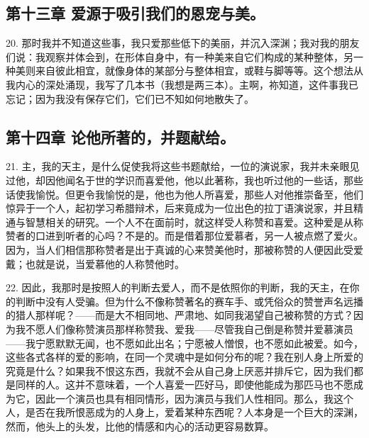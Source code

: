 
\subsection{第十三章 爱源于吸引我们的恩宠与美。}

20. 那时我并不知道这些事，我只爱那些低下的美丽，并沉入深渊；我对我的朋友们说：我观察并体会到，在形体自身中，有一种美来自它们构成的某种整体，另一种美则来自彼此相宜，就像身体的某部分与整体相宜，或鞋与脚等等。这个想法从我内心的深处涌现，我写了几本书（我想是两三本）。主啊，祢知道，这件事我已忘记；因为我没有保存它们，它们已不知如何地散失了。\par


\subsection{第十四章 论他所著的，并题献给。}

21. 主，我的天主，是什么促使我将这些书题献给，一位的演说家，我并未亲眼见过他，却因他闻名于世的学识而喜爱他，他以此著称，我也听过他的一些话，那些话使我愉悦。但更令我愉悦的是，他也为他人所喜爱，那些人对他推崇备至，他们惊异于一个人，起初学习希腊辩术，后来竟成为一位出色的拉丁语演说家，并且精通与智慧相关的研究。一个人不在面前时，就这样受人称赞和喜爱。这种爱是从称赞者的口进到听者的心吗？不是的。而是借着那位爱慕者，另一人被点燃了爱火。因为，当人们相信那称赞者是出于真诚的心来赞美他时，那被称赞的人便因此受爱戴；也就是说，当爱慕他的人称赞他时。\par

22. 因此，我那时是按照人的判断去爱人，而不是依照你的判断，我的天主，在你的判断中没有人受骗。但为什么不像称赞著名的赛车手、或凭俗众的赞誉声名远播的猎人那样呢？——而是大不相同地、严肃地、如同我渴望自己被称赞的方式？因为我不愿人们像称赞演员那样称赞我、爱我——尽管我自己倒是称赞并爱慕演员——我宁愿默默无闻，也不愿如此出名；宁愿被人憎恨，也不愿如此被爱。如今，这些各式各样的爱的影响，在同一个灵魂中是如何分布的呢？我在别人身上所爱的究竟是什么？如果我不恨这东西，我就不会从自己身上厌恶并排斥它，因为我们都是同样的人。这并不意味着，一个人喜爱一匹好马，即使他能成为那匹马也不愿成为它，因此一个演员也具有相同情形，因为演员与我们人性相同。那么，我这个人，是否在我所恨恶成为的人身上，爱着某种东西呢？人本身是一个巨大的深渊， 然而，他头上的头发，比他的情感和内心的活动更容易数算。\par

